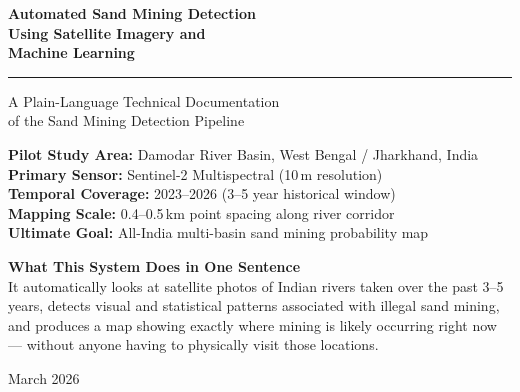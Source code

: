\documentclass[12pt, a4paper]{article}
\begin{document}
\begin{titlepage}
  \centering
  \vspace*{2cm}

  {\Huge\bfseries\color{darkblue}
    Automated Sand Mining Detection\\[0.4em]
    Using Satellite Imagery and\\[0.4em]
    Machine Learning
  \par}

  \vspace{0.5cm}
  \rule{12cm}{1.5pt}
  \vspace{0.5cm}

  {\large\color{medblue}
    A Plain-Language Technical Documentation\\
    of the Sand Mining Detection Pipeline
  \par}

  \vspace{1cm}

  {\normalsize
    \textbf{Pilot Study Area:} Damodar River Basin, West Bengal / Jharkhand, India\\[0.3em]
    \textbf{Primary Sensor:} Sentinel-2 Multispectral (10\,m resolution)\\[0.3em]
    \textbf{Temporal Coverage:} 2023--2026 (3--5 year historical window)\\[0.3em]
    \textbf{Mapping Scale:} 0.4--0.5\,km point spacing along river corridor\\[0.3em]
    \textbf{Ultimate Goal:} All-India multi-basin sand mining probability map
  \par}

  \vspace{2cm}

  \begin{tcolorbox}[colback=lightblue!20, colframe=darkblue, width=12cm]
    \centering
    \textbf{What This System Does in One Sentence}\\[0.5em]
    \normalsize
    It automatically looks at satellite photos of Indian rivers taken over
    the past 3--5 years, detects visual and statistical patterns associated
    with illegal sand mining, and produces a map showing exactly where
    mining is likely occurring right now --- without anyone having to
    physically visit those locations.
  \end{tcolorbox}

  \vfill
  {\small March 2026}
\end{titlepage}
\end{document}
